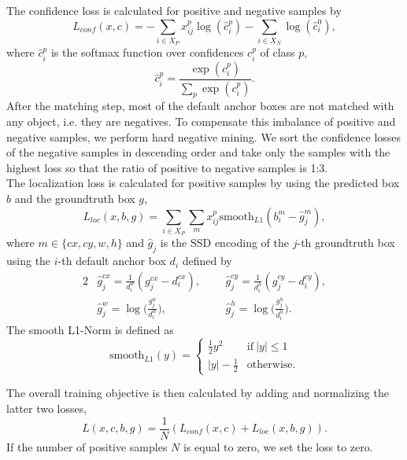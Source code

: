 The confidence loss is calculated for positive and negative samples by
\begin{equation*}
  L_{conf}(x, c) = - \sum_{i \in X_P} x_{ij}^p \log(\hat{c}_i^p) - \sum_{i \in X_N} \log(\hat{c}_i^0),
\end{equation*}
where $\hat{c}_i^p$ is the softmax function over confidences $c_i^p$ of class $p$,
\begin{equation*}
  \hat{c}_i^p = \frac{\exp(c_i^p)}{\sum_p \exp(c_i^p)}.
\end{equation*}
After the matching step, most of the default anchor boxes are not matched with any object, i.e. they are negatives. To compensate this imbalance of positive and negative samples, we perform hard negative mining. We sort the confidence losses of the negative samples in descending order and take only the samples with the highest loss so that the ratio of positive to negative samples is 1:3. \\

The localization loss is calculated for positive samples by using the predicted box $b$ and the groundtruth box $g$,
\begin{equation*}
  L_{loc}(x, b, g) = \sum_{i \in X_P} \sum_m x_{ij}^p \text{smooth}_{L1}(b_i^m - \hat{g}_j^m),
\end{equation*}
where $m \in \{cx, cy, w, h\}$ and $\hat{g}_j$ is the SSD encoding of the $j$-th groundtruth box using the $i$-th default anchor box $d_i$ defined by
\begin{alignat*}{2}
  & \hat{g}_j^{cx} = \frac{1}{d_i^w} (g_j^{cx} - d_i^{cx}),\ \ \ && \hat{g}_j^{cy} = \frac{1}{d_i^h} (g_j^{cy} - d_i^{cy}), \\
  & \hat{g}_j^{w} = \log\Big(\frac{g_j^w}{d_i^w}\Big), && \hat{g}_j^{h} = \log\Big(\frac{g_j^h}{d_i^h}\Big).
\end{alignat*}
The smooth L1-Norm is defined as
\begin{equation*}
  \text{smooth}_{L1}(y) = \begin{cases}
    \frac{1}{2} y^2 & \text{if} \ \lvert y \rvert \leq 1 \\
    \lvert y \rvert - \frac{1}{2} & \text{otherwise}.
  \end{cases}
\end{equation*}

The overall training objective is then calculated by adding and normalizing the latter two losses,
\begin{equation*}
  L(x, c, b, g) = \frac{1}{N} (L_{conf}(x, c) + L_{loc}(x, b, g)).
\end{equation*}
If the number of positive samples $N$ is equal to zero, we set the loss to zero.

